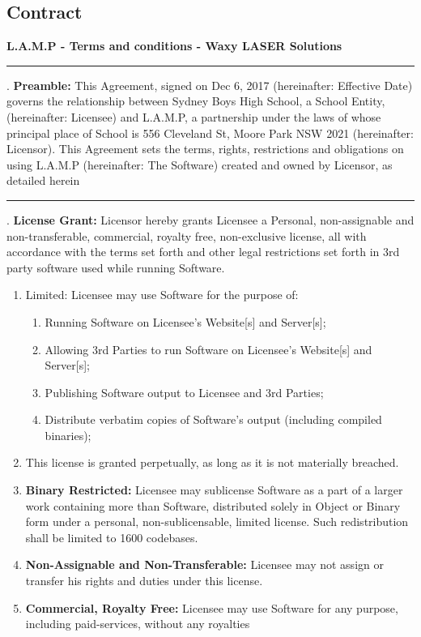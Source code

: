 \documentclass[oneside,openany,11pt,a4paper]{report}
\begin{document}
\subsection{Contract}
\centering\Large\textbf{L.A.M.P - Terms and conditions - Waxy LASER Solutions}\\
\rule{\textwidth}{2pt}

\flushleft
\small
{}. \textbf{Preamble:} This Agreement, signed on Dec 6, 2017 (hereinafter: Effective Date) governs the relationship between Sydney Boys High School, a School Entity, (hereinafter: Licensee) and L.A.M.P, a partnership under the laws of whose principal place of School is 556 Cleveland St, Moore Park NSW 2021 (hereinafter: Licensor). This Agreement sets the terms, rights, restrictions and obligations on using L.A.M.P (hereinafter: The Software) created and owned by Licensor, as detailed herein

\noindent\rule{\textwidth}{0.5pt}
. \textbf{License Grant:} Licensor hereby grants Licensee a Personal, non-assignable and non-transferable, commercial, royalty free, non-exclusive license, all with accordance with the terms set forth and other legal restrictions set forth in 3rd party software used while running Software.


\begin{enumerate}
	\item Limited: Licensee may use Software for the purpose of: \begin{enumerate}
		\item Running Software on Licensee’s Website[s] and Server[s]; 
		\item Allowing 3rd Parties to run Software on Licensee’s Website[s] and Server[s]; 
		\item Publishing Software output to Licensee and 3rd Parties; 
		\item Distribute verbatim copies of Software’s output (including compiled binaries);
	\end{enumerate}
\item This license is granted perpetually, as long as it is not materially breached.
\item \textbf{Binary Restricted:} Licensee may sublicense Software as a part of a larger work containing more than Software, distributed solely in Object or Binary form under a personal, non-sublicensable, limited license. Such redistribution shall be limited to 1600 codebases.
\item \textbf{Non-Assignable and Non-Transferable:} Licensee may not assign or transfer his rights and duties under this license.
\item \textbf{Commercial, Royalty Free:} Licensee may use Software for any purpose, including paid-services, without any royalties

\end{enumerate}
\end{document}
